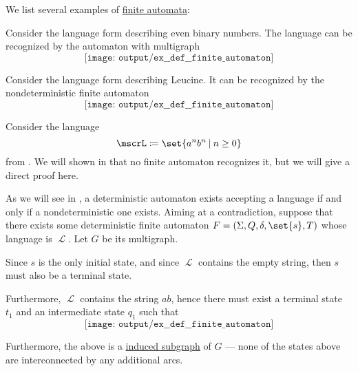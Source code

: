 \begin{example}\label{ex:def:finite_automaton}
  We list several examples of \hyperref[def:finite_automaton]{finite automata}:
  \begin{thmenum}
     Consider the language form  describing even binary numbers. The language can be recognized by the automaton with multigraph
    \begin{equation*}
      \texttt{[image: output/ex\_\_def\_\_finite\_automaton]}
    \end{equation*}

     Consider the language form  describing Leucine. It can be recognized by the nondeterministic finite automaton
    \begin{equation*}
      \texttt{[image: output/ex\_\_def\_\_finite\_automaton]}
    \end{equation*}

     Consider the language
    \begin{equation*}
      \mscrL \coloneqq \set{ a^n b^n \given n \geq 0 }
    \end{equation*}
    from . We will shown in  that no finite automaton recognizes it, but we will give a direct proof here.

    As we will see in , a deterministic automaton exists accepting a language if and only if a nondeterministic one exists. Aiming at a contradiction, suppose that there exists some deterministic finite automaton \( F = (\Sigma, Q, \delta, \set{ s }, T) \) whose language is \( \mscrL \). Let \( G \) be its multigraph.

    Since \( s \) is the only initial state, and since \( \mscrL \) contains the empty string, then \( s \) must also be a terminal state.

    Furthermore, \( \mscrL \) contains the string \( ab \), hence there must exist a terminal state \( t_1 \) and an intermediate state \( q_1 \) such that
    \begin{equation*}
      \texttt{[image: output/ex\_\_def\_\_finite\_automaton]}
    \end{equation*}

    Furthermore, the above is a \hyperref[def:induced_subgraph]{induced subgraph} of \( G \) --- none of the states above are interconnected by any additional arcs.


\end{thmenum}
\end{example}
